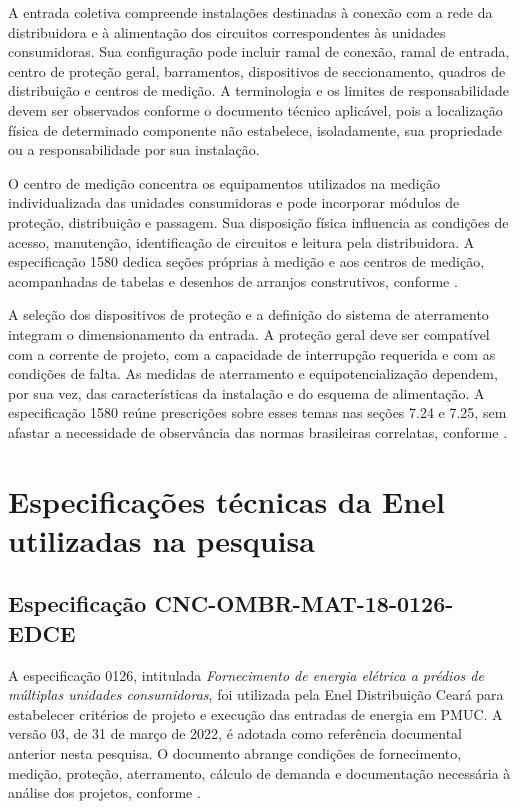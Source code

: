 A entrada coletiva compreende instalações destinadas à conexão com a rede da distribuidora e à alimentação dos circuitos correspondentes às unidades consumidoras. Sua configuração pode incluir ramal de conexão, ramal de entrada, centro de proteção geral, barramentos, dispositivos de seccionamento, quadros de distribuição e centros de medição. A terminologia e os limites de responsabilidade devem ser observados conforme o documento técnico aplicável, pois a localização física de determinado componente não estabelece, isoladamente, sua propriedade ou a responsabilidade por sua instalação.

O centro de medição concentra os equipamentos utilizados na medição individualizada das unidades consumidoras e pode incorporar módulos de proteção, distribuição e passagem. Sua disposição física influencia as condições de acesso, manutenção, identificação de circuitos e leitura pela distribuidora. A especificação 1580 dedica seções próprias à medição e aos centros de medição, acompanhadas de tabelas e desenhos de arranjos construtivos, conforme .

A seleção dos dispositivos de proteção e a definição do sistema de aterramento integram o dimensionamento da entrada. A proteção geral deve ser compatível com a corrente de projeto, com a capacidade de interrupção requerida e com as condições de falta. As medidas de aterramento e equipotencialização dependem, por sua vez, das características da instalação e do esquema de alimentação. A especificação 1580 reúne prescrições sobre esses temas nas seções 7.24 e 7.25, sem afastar a necessidade de observância das normas brasileiras correlatas, conforme .

\section{Especificações técnicas da Enel utilizadas na pesquisa}
\label{sec:especificacoes}

\subsection{Especificação CNC-OMBR-MAT-18-0126-EDCE}
\label{subsec:0126}

A especificação 0126, intitulada \emph{Fornecimento de energia elétrica a prédios de múltiplas unidades consumidoras}, foi utilizada pela Enel Distribuição Ceará para estabelecer critérios de projeto e execução das entradas de energia em PMUC. A versão 03, de 31 de março de 2022, é adotada como referência documental anterior nesta pesquisa. O documento abrange condições de fornecimento, medição, proteção, aterramento, cálculo de demanda e documentação necessária à análise dos projetos, conforme .

